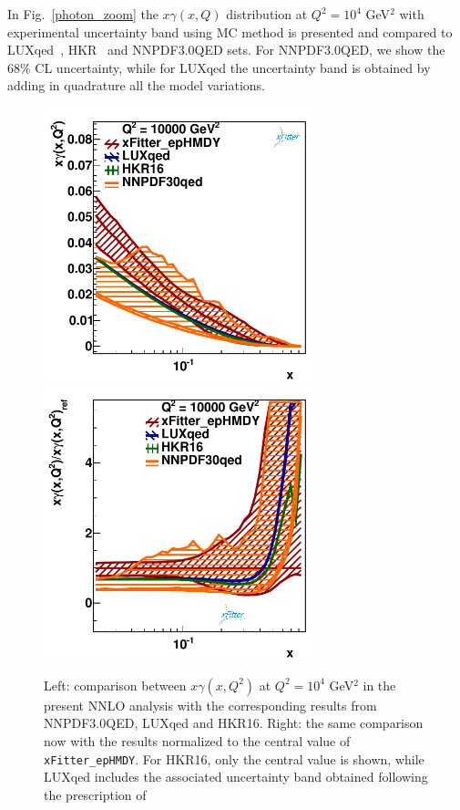 In Fig.~\ref{photon_zoom} the $x\gamma(x,Q)$ distribution at
$Q^2=10^4$ GeV$^2$ with experimental uncertainty band using MC method is presented and compared to LUXqed~\cite{Manohar:2016nzj},
HKR~\cite{Harland-Lang:2016apc} and NNPDF3.0QED sets.
%
%
For NNPDF3.0QED, we show the 68\% CL uncertainty, while for LUXqed the
uncertainty band is obtained by adding in quadrature all the model
variations.

\begin{figure}[t]
  \includegraphics[width=8cm]{figs/photon_comp_10000.pdf}
  \includegraphics[width=8cm]{figs/photon_comp_10000_ratio.pdf} 
\caption{Left: comparison between $x\gamma(x,Q^2)$ at $Q^2=10^4$ GeV$^2$ in the present
  NNLO analysis with the corresponding results from NNPDF3.0QED, LUXqed and HKR16.
  Right: the same comparison now with the results normalized to the central value
  of {\tt xFitter\_epHMDY}.
  For HKR16, only the central value is shown, while LUXqed includes
  the associated uncertainty band obtained following the prescription
  of~\cite{Manohar:2016nzj} }
\label{photon_zoom} \label{photon_zoom_ratio}
\end{figure}

